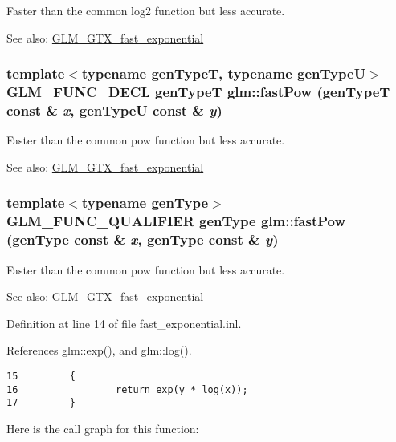Faster than the common log2 function but less accurate. \begin{Desc}
\item[See also:]\hyperlink{group__gtx__fast__exponential}{GLM\_\-GTX\_\-fast\_\-exponential} \end{Desc}
\hypertarget{group__gtx__fast__exponential_g1cbcbe8fc0fd21f221cfc10104a3a773}{
\subsubsection[fastPow]{\setlength{\rightskip}{0pt plus 5cm}template$<$typename genTypeT, typename genTypeU$>$ GLM\_\-FUNC\_\-DECL genTypeT glm::fastPow (genTypeT const \& {\em x}, \/  genTypeU const \& {\em y})}}
\label{group__gtx__fast__exponential_g1cbcbe8fc0fd21f221cfc10104a3a773}


Faster than the common pow function but less accurate. \begin{Desc}
\item[See also:]\hyperlink{group__gtx__fast__exponential}{GLM\_\-GTX\_\-fast\_\-exponential} \end{Desc}
\hypertarget{group__gtx__fast__exponential_g399b134d7015729817135440eb047d5a}{
\subsubsection[fastPow]{\setlength{\rightskip}{0pt plus 5cm}template$<$typename genType$>$ GLM\_\-FUNC\_\-QUALIFIER genType glm::fastPow (genType const \& {\em x}, \/  genType const \& {\em y})}}
\label{group__gtx__fast__exponential_g399b134d7015729817135440eb047d5a}


Faster than the common pow function but less accurate. \begin{Desc}
\item[See also:]\hyperlink{group__gtx__fast__exponential}{GLM\_\-GTX\_\-fast\_\-exponential} \end{Desc}


Definition at line 14 of file fast\_\-exponential.inl.

References glm::exp(), and glm::log().

\begin{Code}\begin{verbatim}15         {
16                 return exp(y * log(x));
17         }
\end{verbatim}
\end{Code}




Here is the call graph for this function: